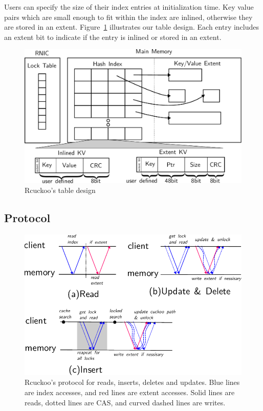 Users can specify the size of their index entries at
initialization time. Key value pairs which are small enough
to fit within the index are inlined, otherwise they are
stored in an extent. Figure~\ref{fig:table-diagram}
illustrates our table design.  Each entry includes an extent
bit to indicate if the entry is inlined or stored in an
extent. 



\begin{figure}[t]
    \includegraphics[width=0.99\linewidth]{fig/table-diagram.pdf}
    \caption{Rcuckoo's table design ~}
    \label{fig:table-diagram}
\end{figure}


\subsection{Protocol}

\begin{figure}[t]
\includegraphics[width=0.99\linewidth]{fig/message_diagram.pdf}

\caption{Rcuckoo's protocol for reads, inserts, deletes and
updates. Blue lines are index accesses, and red lines are
extent accesses. Solid lines are reads, dotted lines are
CAS, and curved dashed lines are writes.}

\label{fig:message_diagram}
\end{figure}

